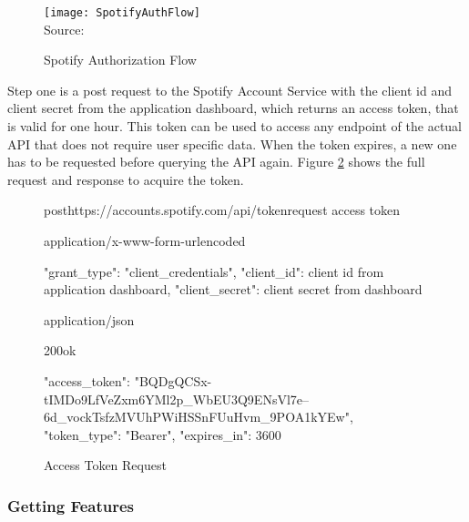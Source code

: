\begin{figure}[H]
    \caption{Spotify Authorization Flow}
	\label{fig:Spotify Authorization Flow}
    \texttt{[image: SpotifyAuthFlow]}
    \\
    Source: \cite{SpotifyAuth}
\end{figure}

Step one is a post request to the Spotify Account Service with the client id and client secret from the application dashboard, which returns an
access token, that is valid for one hour. This token can be used to access any endpoint of the actual \ac{API} that
does not require user specific data. When the token expires, a new one has to be requested before querying the \ac{API} again.
Figure \ref{fig:Access Token Request} shows the full request and response to acquire the token.

\begin{figure}[H]
    \caption{Access Token Request}
	\label{fig:Access Token Request}
\begin{apiRoute}{post}{https://accounts.spotify.com/api/token}{request access token}
    \begin{routeRequest}{application/x-www-form-urlencoded}
        \begin{routeRequestBody}
{
    "grant_type": "client_credentials",
    "client_id": client id from application dashboard,
    "client_secret": client secret from dashboard
}
        \end{routeRequestBody}
    \end{routeRequest}
    \begin{routeResponse}{application/json}
        \begin{routeResponseItem}{200}{ok}
            \begin{routeResponseItemBody}
{
    "access_token": "BQDgQCSx-tIMDo9LfVeZxm6YMl2p_WbEU3Q9ENsVl7e--6d_vockTsfzMVUhPWiHSSnFUuHvm_9POA1kYEw",
    "token_type": "Bearer",
    "expires_in": 3600
}
            \end{routeResponseItemBody}
        \end{routeResponseItem}
    \end{routeResponse}
\end{apiRoute}
\end{figure}


\subsubsection{Getting Features}

